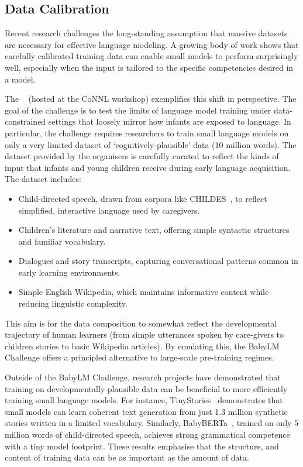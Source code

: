 \subsection{Data Calibration}
Recent research challenges the long-standing assumption that massive datasets are necessary for effective language modeling. A growing body of work shows that carefully calibrated training data can enable small models to perform surprisingly well, especially when the input is tailored to the specific competencies desired in a model.

The ~\citep{warstadt2023babylm1, conll2024babylm2} (hosted at the CoNNL workshop) exemplifies this shift in perspective. The goal of the challenge is to test the limits of language model training under data-constrained settings that loosely mirror how infants are exposed to language. In particular, the challenge requires researchers to train small language models on only a very limited dataset of `cognitively-plausible' data (10 million words). The dataset provided by the organisers is carefully curated to reflect the kinds of input that infants and young children receive during early language acquisition. The dataset includes:

\begin{itemize}
    \item Child-directed speech, drawn from corpora like CHILDES~\citep{macwhinney2000childes}, to reflect simplified, interactive language used by caregivers.
    \item Children's literature and narrative text, offering simple syntactic structures and familiar vocabulary.
    \item Dialogues and story transcripts, capturing conversational patterns common in early learning environments.
    \item Simple English Wikipedia, which maintains informative content while reducing linguistic complexity.
\end{itemize}

This aim is for the data composition to somewhat reflect the developmental trajectory of human learners (from simple utterances spoken by care-givers to children stories to basic Wikipedia articles). By emulating this, the BabyLM Challenge offers a principled alternative to large-scale pre-training regimes.

Outside of the BabyLM Challenge, research projects have demonstrated that training on developmentally-plausible data can be beneficial to more efficiently training small language models. For instance, TinyStories~\citep{eldan2023tinystories} demonstrates that small models can learn coherent text generation from just 1.3 million synthetic stories written in a limited vocabulary. Similarly, BabyBERTa~\citep{huebner2021babyberta}, trained on only 5 million words of child-directed speech, achieves strong grammatical competence with a tiny model footprint. These results emphasise that the structure, and content of training data can be as important as the amount of data. 

